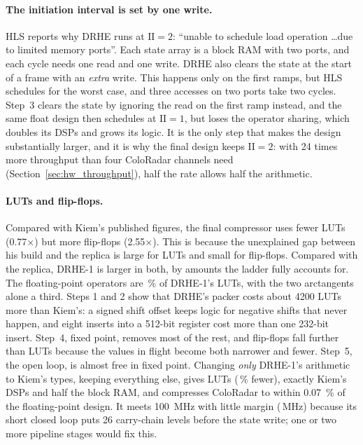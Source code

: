 \paragraph{The initiation interval is set by one write.} HLS reports why DRHE
runs at $\mathrm{II} = 2$: ``unable to schedule load operation \ldots due to
limited memory ports''. Each state array is a block RAM with two ports, and
each cycle needs one read and one write. DRHE also clears the state at the
start of a frame with an \emph{extra} write. This happens only on the first
ramps, but HLS schedules for the worst case, and three accesses on two ports
take two cycles. Step~3 clears the state by ignoring the read on the first ramp
instead, and the same float design then schedules at $\mathrm{II} = 1$, but
loses the operator sharing, which doubles its DSPs and grows its logic. It is
the only step that makes the design substantially larger, and it is why the
final design keeps $\mathrm{II} = 2$: with 24 times more throughput than four
ColoRadar channels need (Section~\ref{sec:hw_throughput}), half the rate allows
half the arithmetic.

\paragraph{LUTs and flip-flops.} Compared with Kiem's published figures, the
final compressor uses fewer LUTs (0.77$\times$) but more flip-flops
(2.55$\times$). This is because the unexplained gap between his build and the
replica is large for LUTs and small for flip-flops. Compared with the replica,
DRHE-1 is larger in both, by amounts the ladder fully accounts for. The
floating-point operators are \,\% of DRHE-1's LUTs, with
the two arctangents alone a third. Steps 1 and 2 show that DRHE's packer costs
about \num{4200} LUTs more than Kiem's: a signed shift offset keeps logic for
negative shifts that never happen, and eight inserts into a 512-bit register
cost more than one 232-bit insert. Step~4, fixed point, removes most of the
rest, and flip-flops fall further than LUTs because the values in flight become
both narrower and fewer. Step~5, the open loop, is almost free in fixed point.
Changing \emph{only} DRHE-1's arithmetic to Kiem's types, keeping everything
else, gives  LUTs (\,\% fewer), exactly Kiem's
 DSPs and half the block RAM, and compresses ColoRadar to within
\SI{0.07}{\percent} of the floating-point design. It meets
\SI{100}{\mega\hertz} with little margin (\,MHz) because its
short closed loop puts 26 carry-chain levels before the state write; one or two
more pipeline stages would fix this.

